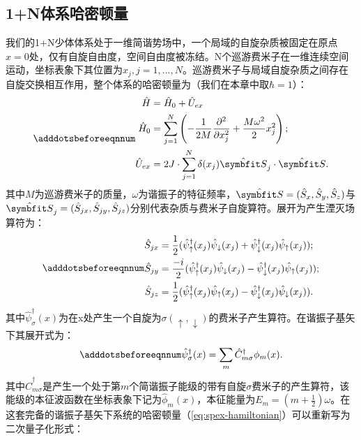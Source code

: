 \subsection{1+N体系哈密顿量}
我们的1+N少体体系处于一维简谐势场中，一个局域的自旋杂质被固定在原点$x=0$处，仅有自旋自由度，空间自由度被冻结。N个巡游费米子在一维连续空间运动，坐标表象下其位置为$x_j,j=1,...,N$。巡游费米子与局域自旋杂质之间存在自旋交换相互作用，整个体系的哈密顿量为（我们在本章中取$\hbar=1$）：
\begin{equation}\label{eq:spex-hamiltonian}
\adddotsbeforeeqnnum%
    \begin{split}
       	\hat{H}  &= \hat{H}_0 + \hat{U}_{ex}\\
		\hat{H}_0 &= \sum_{j=1}^{N} \left( -\frac{1}{2M} \frac{\partial^2}{\partial x_{j}^2}   +\frac{M\omega^2}{2}x_{j}^2 \right); \\
		\hat{U}_{ex} &= 2J\cdot\sum_{j=1}^N\delta(x_j){\hat{\Vector{S}}}_j\cdot {\hat{\Vector{S}}}.
    \end{split}
\end{equation}
其中$M$为巡游费米子的质量，$\omega$为谐振子的特征频率，$\hat{\Vector{S}}=(\hat{S}_{x},\hat{S}_{y},\hat{S}_{z})$与$\hat{\Vector{S}}_j=(\hat{S}_{jx},\hat{S}_{jy},\hat{S}_{jz})$分别代表杂质与费米子自旋算符。展开为产生湮灭场算符为：
\begin{equation}\label{eq:spex-field}
\adddotsbeforeeqnnum%
    \begin{split}
		\hat{S}_{jx} &= \frac{1}{2}(\hat{\psi}_{\uparrow}^{\dag}(x_j)\hat{\psi}_{\downarrow}(x_j)+\hat{\psi}_{\downarrow}^{\dag}(x_j)\hat{\psi}_{\uparrow}(x_j));\\
		\hat{S}_{jy} &= \frac{-i}{2}(\hat{\psi}_{\uparrow}^{\dag}(x_j)\hat{\psi}_{\downarrow}(x_j)-\hat{\psi}_{\downarrow}^{\dag}(x_j)\hat{\psi}_{\uparrow}(x_j));\\
		\hat{S}_{jz} &= \frac{1}{2}(\hat{\psi}_{\uparrow}^{\dag}(x_j)\hat{\psi}_{\uparrow}(x_j)-\hat{\psi}_{\downarrow}^{\dag}(x_j)\hat{\psi}_{\downarrow}(x_j)).
    \end{split}
\end{equation}
其中$\hat{\psi}_{\sigma}^{\dag}(x)$为在x处产生一个自旋为$\sigma(\uparrow,\downarrow)$的费米子产生算符。在谐振子基矢下其展开式为：
\begin{equation}
\adddotsbeforeeqnnum%
	\hat{\psi}_{\sigma}^{\dag}(x)=\sum_m \hat{C}_{m\sigma}^{\dag} \phi_m(x).
\end{equation}
其中$\hat{C}_{m\sigma}^\dagger$是产生一个处于第$m$个简谐振子能级的带有自旋$\sigma$费米子的产生算符，该能级的本征波函数在坐标表象下记为$\hat{\phi}_m(x)$，本征能量为$E_m = (m+\frac{1}{2})\omega$。在这套完备的谐振子基矢下系统的哈密顿量（\ref{eq:spex-hamiltonian}）可以重新写为二次量子化形式：
